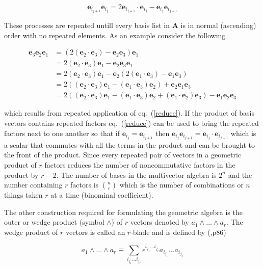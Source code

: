 \documentclass[12pt]{report}
\newcommand{\bm}[1]{\boldsymbol{#1}}
\newcommand{\lp}{\left (}
\newcommand{\rp}{\right )}
\newcommand{\W}{\wedge}
\newcommand{\paren}[1]{\lp {#1} \rp}
\newcommand{\eb}{\bm{e}}
\begin{document}
   \begin{equation}\label{reduce}
      \eb_{i_{j+1}}\eb_{i_{j}} = 2\eb_{i_{j+1}}\cdot \eb_{i_{j}} - \eb_{i_{j}}\eb_{i_{j+1}}
   \end{equation}

These processes are repeated untill every basis list in $\bm{A}$ is in normal
(ascending) order with no repeated elements. As an example consider the
following

   \begin{align}
      \eb_{3}\eb_{2}\eb_{1} &= (2(\eb_{2}\cdot \eb_{3}) - \eb_{2}\eb_{3})\eb_{1} \\
                      &= 2\paren{\eb_{2}\cdot \eb_{3}}\eb_{1} - \eb_{2}\eb_{3}\eb_{1} \\
                      &= 2\paren{\eb_{2}\cdot \eb_{3}}\eb_{1} - \eb_{2}\paren{2\paren{\eb_{1}\cdot \eb_{3}}-\eb_{1}\eb_{3}} \\
                      &= 2\paren{\paren{\eb_{2}\cdot \eb_{3}}\eb_{1}-\paren{\eb_{1}\cdot \eb_{3}}\eb_{2}}+\eb_{2}\eb_{1}\eb_{3} \\
                      &= 2\paren{\paren{\eb_{2}\cdot \eb_{3}}\eb_{1}-\paren{\eb_{1}\cdot \eb_{3}}\eb_{2}+
                         \paren{\eb_{1}\cdot \eb_{2}}\eb_{3}}-\eb_{1}\eb_{2}\eb_{3}
   \end{align}

which results from repeated application of eq.~(\ref{reduce}).  If the product of basis vectors contains repeated factors
eq.~(\ref{reduce}) can be used to bring the repeated factors next to one another so that if $\eb_{i_{j}} = \eb_{i_{j+1}}$
then $\eb_{i_{j}}\eb_{i_{j+1}} = \eb_{i_{j}}\cdot \eb_{i_{j+1}}$ which is a scalar that commutes with all the terms in the product
and can be brought to the front of the product.  Since every repeated pair of vectors in a geometric product of $r$ factors
reduces the number of noncommutative factors in the product by $r-2$. The number of bases in the multivector algebra is $2^{n}$
and the number containing $r$ factors is ${n\choose r}$ which is the number of combinations or $n$ things
taken $r$ at a time (binominal coefficient).

The other construction required for formulating the geometric algebra is the outer or wedge product (symbol $\W$) of $r$
vectors denoted by $a_{1}\W\dots\W a_{r}$.  The wedge product of $r$ vectors is called an $r$-blade and is defined
by (\cite{Doran},p86)

   \begin{equation}
      a_{1}\W\dots\W a_{r} \equiv \sum_{i_{j_{1}}\dots i_{j_{r}}} \epsilon^{i_{j_{1}}\dots i_{j_{r}}}a_{i_{j_{1}}}\dots a_{i_{j_{1}}}
   \end{equation}
\end{document}

